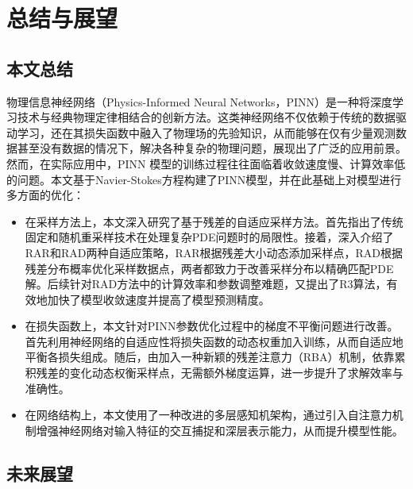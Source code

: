 \chapter{总结与展望}

\section{本文总结}

物理信息神经网络（Physics-Informed Neural Networks，PINN）是一种将深度学习技术与经典物理定律相结合的创新方法。这类神经网络不仅依赖于传统的数据驱动学习，还在其损失函数中融入了物理场的先验知识，从而能够在仅有少量观测数据甚至没有数据的情况下，解决各种复杂的物理问题，展现出了广泛的应用前景。然而，在实际应用中，PINN 模型的训练过程往往面临着收敛速度慢、计算效率低的问题。本文基于Navier-Stokes方程构建了PINN模型，并在此基础上对模型进行多方面的优化：
\begin{itemize}
    \item 在采样方法上，本文深入研究了基于残差的自适应采样方法。首先指出了传统固定和随机重采样技术在处理复杂PDE问题时的局限性。接着，深入介绍了RAR和RAD两种自适应策略，RAR根据残差大小动态添加采样点，RAD根据残差分布概率优化采样数据点，两者都致力于改善采样分布以精确匹配PDE解。后续针对RAD方法中的计算效率和参数调整难题，又提出了R3算法，有效地加快了模型收敛速度并提高了模型预测精度。
    \item 在损失函数上，本文针对PINN参数优化过程中的梯度不平衡问题进行改善。首先利用神经网络的自适应性将损失函数的动态权重加入训练，从而自适应地平衡各损失组成。随后，由加入一种新颖的残差注意力（RBA）机制，依靠累积残差的变化动态权衡采样点，无需额外梯度运算，进一步提升了求解效率与准确性。
    \item 在网络结构上，本文使用了一种改进的多层感知机架构，通过引入自注意力机制增强神经网络对输入特征的交互捕捉和深层表示能力，从而提升模型性能。
\end{itemize}

\section{未来展望}

